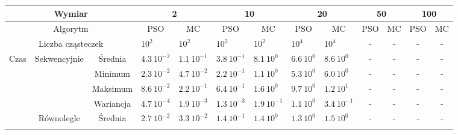 \documentclass[11pt, a4paper, oneside]{article}
\begin{document}
\renewcommand{\arraystretch}{2}
\begin{table}[t]
\scriptsize
\begin{adjustwidth}{-1.76cm}{}
\centering
\begin{tabular}{|c|c|c|l|l|l|l|l|l|c|c|c|c|}
\hline
\multicolumn{3}{|c|}{Wymiar}                                      & \multicolumn{2}{c|}{2}                             & \multicolumn{2}{c|}{10}                            & \multicolumn{2}{c|}{20}                            & \multicolumn{2}{c|}{50} & \multicolumn{2}{c|}{100} \\ \hline
\multicolumn{3}{|c|}{Algorytm}                                    & \multicolumn{1}{c|}{PSO} & \multicolumn{1}{c|}{MC} & \multicolumn{1}{c|}{PSO} & \multicolumn{1}{c|}{MC} & \multicolumn{1}{c|}{PSO} & \multicolumn{1}{c|}{MC} & PSO         & MC        & PSO         & MC         \\ \hline
\multicolumn{3}{|c|}{Liczba cząsteczek}                           & $10^{2}$                 & $10^{2}$                & $10^{2}$                 & $10^{2}$                & $10^{4}$                 & $10^{4}$                & -           & -         & -           & -          \\ \hline
\multirow{8}{*}{Czas} & \multirow{4}{*}{Sekwencyjnie} & Średnia   & $4.3 \ 10^{-2}$          & $1.1 \ 10^{-1}$         & $3.8 \ 10^{-1}$          & $8.1 \ 10^{0}$          & $6.6 \ 10^{0}$           & $8.6 \ 10^{0}$          & -           & -         & -           & -          \\ \cline{3-13} 
                      &                               & Minimum   & $2.3 \ 10^{-2}$          & $4.7 \ 10^{-2}$         & $2.2 \ 10^{-1}$          & $1.1 \ 10^{0}$          & $5.3 \ 10^{0}$           & $6.0 \ 10^{0}$          & -           & -         & -           & -          \\ \cline{3-13} 
                      &                               & Maksimum  & $8.6 \ 10^{-2}$          & $2.2 \ 10^{-1}$         & $6.4 \ 10^{-1}$          & $1.6 \ 10^{0}$          & $9.7 \ 10^{0}$           & $1.2 \ 10^{1}$          & -           & -         & -           & -          \\ \cline{3-13} 
                      &                               & Wariancja & $4.7 \ 10^{-4}$          & $1.9 \ 10^{-3}$         & $1.3 \ 10^{-3}$          & $1.9 \ 10^{-1}$         & $1.1 \ 10^{0}$           & $3.4 \ 10^{-1}$         & -           & -         & -           & -          \\ \cline{2-13} 
                      & \multirow{4}{*}{Równolegle}   & Średnia   & $2.7 \ 10^{-2}$          & $3.3 \ 10^{-2}$         & $1.4 \ 10^{-1}$          & $1.4 \ 10^{0}$          & $1.3 \ 10^{0}$           & $1.5 \ 10^{0}$          & -           & -         & -           & -          \\ \cline{3-13} 

\end{tabular}
\end{adjustwidth}
\end{table}
\end{document}
